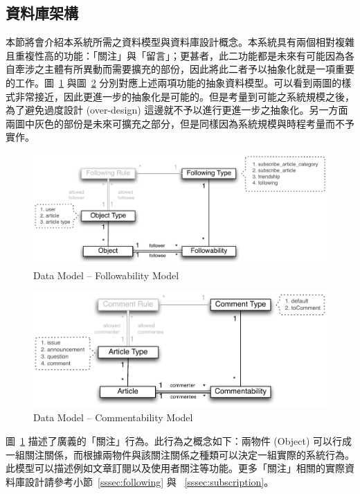 \subsection{資料庫架構}

本節將會介紹本系統所需之資料模型與資料庫設計概念。本系統具有兩個相對複雜且重複性高的功能：「關注」與「留言」；更甚者，此二功能都是未來有可能因為各自牽涉之主體有所異動而需要擴充的部份，因此將此二者予以抽象化就是一項重要的工作。圖~\ref{pic:data:followability} 與圖~\ref{pic:data:commentability} 分別對應上述兩項功能的抽象資料模型。可以看到兩圖的樣式非常接近，因此更進一步的抽象化是可能的。但是考量到可能之系統規模之後，為了避免過度設計 (over-design) 這邊就不予以進行更進一步之抽象化。另一方面兩圖中灰色的部份是未來可擴充之部分，但是同樣因為系統規模與時程考量而不予實作。

\begin{figure}[h]
\centering
\includegraphics[width=1.05\textwidth]{img/followability_real.pdf}
\caption{Data Model -- Followability Model}
\label{pic:data:followability}
\end{figure}

\begin{figure}[h]
\centering
\includegraphics[width=1.05\textwidth]{img/commentability.pdf}
\caption{Data Model -- Commentability Model}
\label{pic:data:commentability}
\end{figure}

圖~\ref{pic:data:followability} 描述了廣義的「關注」行為。此行為之概念如下：兩物件 (Object)  可以行成一組關注關係，而根據兩物件與該關注關係之種類可以決定一組實際的系統行為。此模型可以描述例如文章訂閱以及使用者關注等功能。更多「關注」相關的實際資料庫設計請參考小節~\ref{sssec:following} 與 ~\ref{sssec:subscription}。

